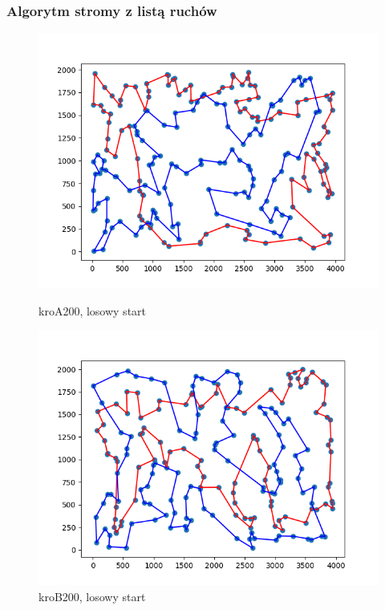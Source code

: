 \documentclass[11pt]{article}
\begin{document}
\subsubsection{Algorytm stromy z listą ruchów}\label{subsubsec:algorytm-stromy-z-lista-ruchow}

\begin{figure}[H]
    \begin{minipage}[t]{0.45\textwidth}
        \centering
        \includegraphics[width=\linewidth]{best_paths/kroA200/steepest_LM}
        \caption{kroA200, losowy start}
    \end{minipage}
    \hfill
    \begin{minipage}[t]{0.45\textwidth}
        \centering
        \includegraphics[width=\linewidth]{best_paths/kroB200/steepest_LM}
        \caption{kroB200, losowy start}
    \end{minipage}\label{fig:figure2}
\end{figure}
\end{document}
